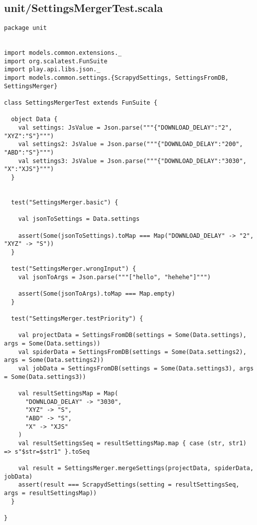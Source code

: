 \subsection{unit/SettingsMergerTest.scala}
\begin{lstlisting}
package unit


import models.common.extensions._
import org.scalatest.FunSuite
import play.api.libs.json._
import models.common.settings.{ScrapydSettings, SettingsFromDB, SettingsMerger}

class SettingsMergerTest extends FunSuite {

  object Data {
    val settings: JsValue = Json.parse("""{"DOWNLOAD_DELAY":"2", "XYZ":"S"}""")
    val settings2: JsValue = Json.parse("""{"DOWNLOAD_DELAY":"200", "ABD":"S"}""")
    val settings3: JsValue = Json.parse("""{"DOWNLOAD_DELAY":"3030", "X":"XJS"}""")
  }


  test("SettingsMerger.basic") {

    val jsonToSettings = Data.settings

    assert(Some(jsonToSettings).toMap === Map("DOWNLOAD_DELAY" -> "2", "XYZ" -> "S"))
  }

  test("SettingsMerger.wrongInput") {
    val jsonToArgs = Json.parse("""["hello", "hehehe"]""")

    assert(Some(jsonToArgs).toMap === Map.empty)
  }

  test("SettingsMerger.testPriority") {

    val projectData = SettingsFromDB(settings = Some(Data.settings), args = Some(Data.settings))
    val spiderData = SettingsFromDB(settings = Some(Data.settings2), args = Some(Data.settings2))
    val jobData = SettingsFromDB(settings = Some(Data.settings3), args = Some(Data.settings3))

    val resultSettingsMap = Map(
      "DOWNLOAD_DELAY" -> "3030",
      "XYZ" -> "S",
      "ABD" -> "S",
      "X" -> "XJS"
    )
    val resultSettingsSeq = resultSettingsMap.map { case (str, str1) => s"$str=$str1" }.toSeq

    val result = SettingsMerger.mergeSettings(projectData, spiderData, jobData)
    assert(result === ScrapydSettings(setting = resultSettingsSeq, args = resultSettingsMap))
  }

}
\end{lstlisting}
